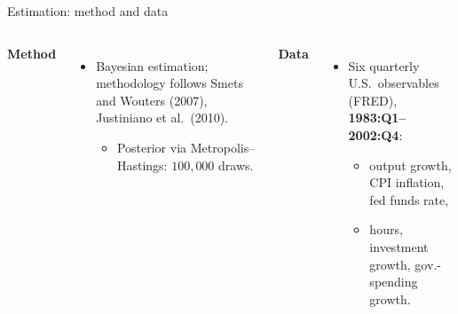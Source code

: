 \documentclass[9pt]{beamer}
\begin{document}
\begin{frame}{Estimation: method and data}
	\begin{columns}[T,onlytextwidth]
		\textbf{Method}
		\begin{itemize}
			\item Bayesian estimation; methodology follows Smets and Wouters (2007),  Justiniano et al.\ (2010).
			\begin{itemize}
				\item Posterior via Metropolis--Hastings: $100{,}000$ draws.
			\end{itemize}
		\end{itemize}
		\textbf{Data}
		\begin{itemize}
			\item Six quarterly U.S.\ observables (FRED), \textbf{1983:Q1--2002:Q4}:
			\begin{itemize}\small
				\item output growth, CPI inflation, fed funds rate,
				\item hours, investment growth, gov.-spending growth.
			\end{itemize}
		\end{itemize}
	\end{columns}
\end{frame}
\end{document}
